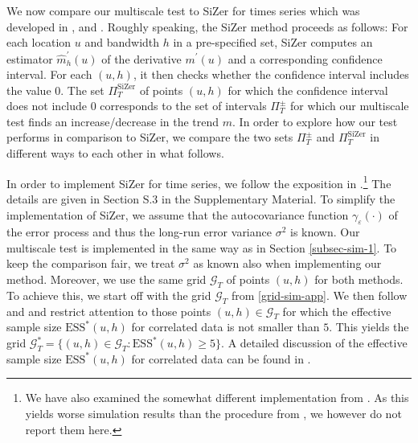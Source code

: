 We now compare our multiscale test to SiZer for times series which was developed in \cite{Rondonotti2004}, \cite{Rondonotti2007} and \cite{ParkHannigKang2009}. Roughly speaking, the SiZer method proceeds as follows: For each location $u$ and bandwidth $h$ in a pre-specified set, SiZer computes an estimator $\widehat{m}_h^\prime(u)$ of the derivative $m^\prime(u)$ and a corresponding confidence interval. For each $(u,h)$, it then checks whether the confidence interval includes the value $0$. The set $\Pi_T^{\text{SiZer}}$ of points $(u,h)$ for which the confidence interval does not include $0$ corresponds to the set of intervals $\Pi_T^\pm$ for which our multiscale test finds an increase/decrease in the trend $m$. %
In order to explore how our test performs in comparison to SiZer, we compare the two sets $\Pi_T^\pm$ and $\Pi_T^{\text{SiZer}}$ in different ways to each other in what follows. 


In order to implement SiZer for time series, we follow the exposition in \cite{ParkHannigKang2009}.\footnote{We have also examined the somewhat different implementation from \cite{Rondonotti2007}. As this yields worse simulation results than the procedure from \cite{ParkHannigKang2009}, we however do not report them here.} The details are given in Section S.3 in the Supplementary Material. To simplify the implementation of SiZer, we assume that the autocovariance function $\gamma_\varepsilon(\cdot)$ of the error process and thus the long-run error variance $\sigma^2$ is known. Our multiscale test is implemented in the same way as in Section \ref{subsec-sim-1}. To keep the comparison fair, we treat $\sigma^2$ as known also when implementing our method. Moreover, we use the same grid $\mathcal{G}_T$ of points $(u,h)$ for both methods. To achieve this, we start off with the grid $\mathcal{G}_T$ from \eqref{grid-sim-app}. We then follow \cite{Rondonotti2007} and \cite{ParkHannigKang2009} and restrict attention to those points $(u,h) \in \mathcal{G}_T$ for which the effective sample size $\text{ESS}^*(u,h)$ for correlated data is not smaller than $5$. This yields the grid $\mathcal{G}_T^* = \{ (u, h) \in \mathcal{G}_T : \text{ESS}^*(u, h) \geq 5 \}$. A detailed discussion of the effective sample size $\text{ESS}^*(u,h)$ for correlated data can be found in \cite{Rondonotti2007}.   


